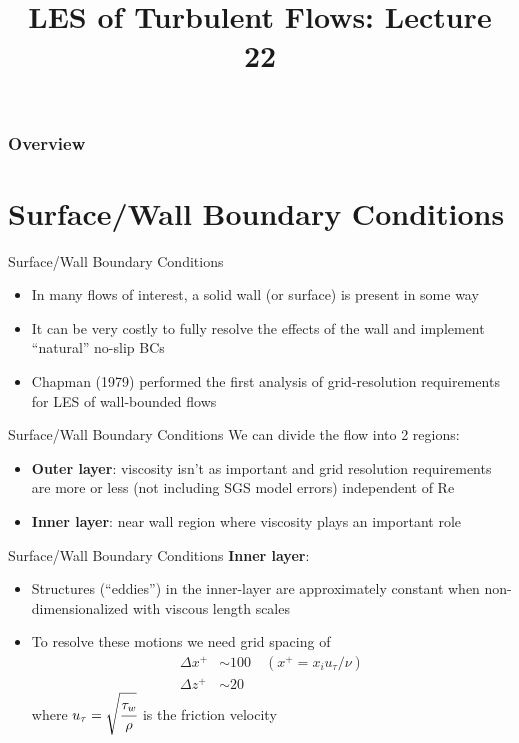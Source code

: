  
\title{LES of Turbulent Flows: Lecture 22}



\begin{frame} 
  \titlepage
\end{frame}


\begin{frame}
\frametitle{Overview}
\tableofcontents
\end{frame}

\section{Surface/Wall Boundary Conditions} %
\begin{frame}{Surface/Wall Boundary Conditions}
\begin{itemize}
	\item In many flows of interest, a solid wall (or surface) is present in some way
	\item It can be very costly to fully resolve the effects of the wall and implement ``natural'' no-slip BCs
	\item Chapman (1979) performed the first analysis of grid-resolution requirements for LES of wall-bounded flows
\end{itemize}
\end{frame}
\begin{frame}{Surface/Wall Boundary Conditions}
We can divide the flow into 2 regions:
\begin{itemize}
	\item \textbf{Outer layer}:  viscosity isn't as important and grid resolution requirements are more or less (not including SGS model errors) independent of Re
	\item \textbf{Inner layer}:  near wall region where viscosity plays an important role
\end{itemize}
\end{frame}
\begin{frame}{Surface/Wall Boundary Conditions}
\textbf{Inner layer}:
\begin{itemize}
	\item Structures (``eddies'') in the inner-layer are approximately constant when non-dimensionalized with viscous length scales
	\item To resolve these motions we need grid spacing of
	\begin{align*}
		\Delta x^+ &\sim 100\quad (x^+ = x_i u_{\tau}/\nu)\\
		\Delta z^+ &\sim 20
	\end{align*}
	where $u_{\tau} = \sqrt{\cfrac{\tau_w}{\rho}}$ is the friction velocity
\end{itemize}
\end{frame}
